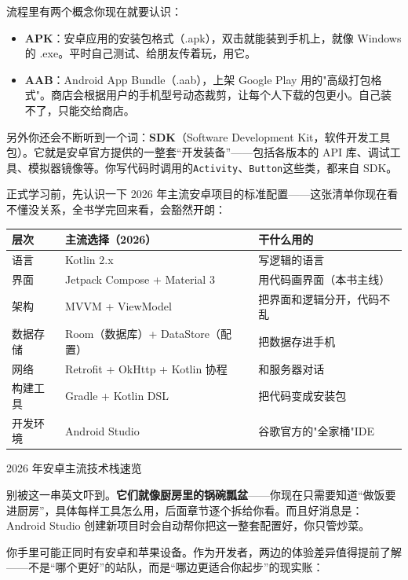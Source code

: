 流程里有两个概念你现在就要认识：

\begin{itemize}
  \item \textbf{APK}：安卓应用的安装包格式（.apk），双击就能装到手机上，就像 Windows 的 .exe。平时自己测试、给朋友传着玩，用它。
  \item \textbf{AAB}：Android App Bundle（.aab），上架 Google Play 用的"高级打包格式"。商店会根据用户的手机型号动态裁剪，让每个人下载的包更小。自己装不了，只能交给商店。
\end{itemize}

另外你还会不断听到一个词：\textbf{SDK}（Software Development Kit，软件开发工具包）。它就是安卓官方提供的一整套“开发装备”——包括各版本的 API 库、调试工具、模拟器镜像等。你写代码时调用的\texttt{Activity}、\texttt{Button}这些类，都来自 SDK。


正式学习前，先认识一下 2026 年主流安卓项目的标准配置——这张清单你现在看不懂没关系，全书学完回来看，会豁然开朗：

\begin{center}
\begin{tabularx}{\linewidth}{|X|X|X|}
\hline
\textbf{层次} & \textbf{主流选择（2026）} & \textbf{干什么用的} \tabularnewline
\hline
语言 & Kotlin 2.x & 写逻辑的语言 \tabularnewline
界面 & Jetpack Compose + Material 3 & 用代码画界面（本书主线） \tabularnewline
架构 & MVVM + ViewModel & 把界面和逻辑分开，代码不乱 \tabularnewline
数据存储 & Room（数据库）+ DataStore（配置） & 把数据存进手机 \tabularnewline
网络 & Retrofit + OkHttp + Kotlin 协程 & 和服务器对话 \tabularnewline
构建工具 & Gradle + Kotlin DSL & 把代码变成安装包 \tabularnewline
开发环境 & Android Studio & 谷歌官方的"全家桶"IDE \tabularnewline
\hline
\end{tabularx}
\end{center}

\begin{center}\small\color{gray}2026 年安卓主流技术栈速览\end{center}

别被这一串英文吓到。\textbf{它们就像厨房里的锅碗瓢盆}——你现在只需要知道“做饭要进厨房”，具体每样工具怎么用，后面章节逐个拆给你看。而且好消息是：Android Studio 创建新项目时会自动帮你把这一整套配置好，你只管炒菜。


你手里可能正同时有安卓和苹果设备。作为开发者，两边的体验差异值得提前了解——不是“哪个更好”的站队，而是“哪边更适合你起步”的现实账：

